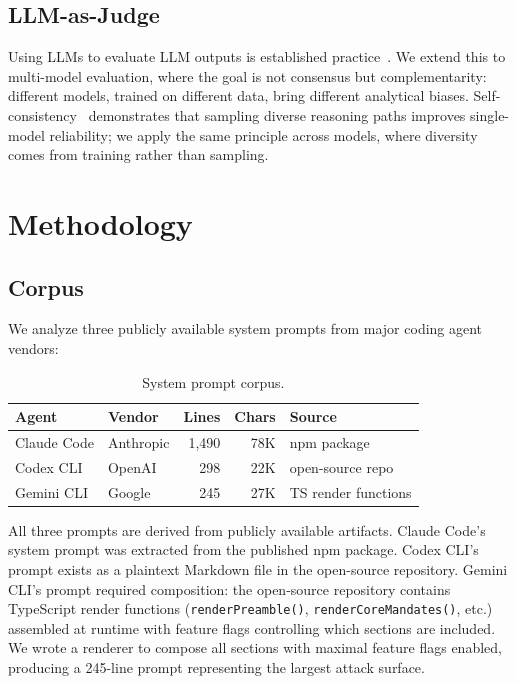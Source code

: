 \documentclass[11pt,a4paper]{article}
\begin{document}
\subsection{LLM-as-Judge}

Using LLMs to evaluate LLM outputs is established
practice~\citep{zheng2023judging}. We extend this to multi-model
evaluation, where the goal is not consensus but complementarity:
different models, trained on different data, bring different analytical
biases. Self-consistency~\citep{wang2022self} demonstrates that
sampling diverse reasoning paths improves single-model reliability; we
apply the same principle across models, where diversity comes from
training rather than sampling.


\section{Methodology}
\label{sec:methodology}

\subsection{Corpus}
\label{sec:corpus}

We analyze three publicly available system prompts from major coding
agent vendors:

\begin{table}[H]
\centering
\caption{System prompt corpus.}
\label{tab:corpus}
\begin{tabular}{@{}llrrl@{}}
\toprule
Agent & Vendor & Lines & Chars & Source \\
\midrule
Claude Code & Anthropic & 1{,}490 & 78K & npm package \\
Codex CLI & OpenAI & 298 & 22K & open-source repo \\
Gemini CLI & Google & 245 & 27K & TS render functions \\
\bottomrule
\end{tabular}
\end{table}

All three prompts are derived from publicly available artifacts. Claude
Code's system prompt was extracted from the published npm package.
Codex CLI's prompt exists as a plaintext Markdown file in the
open-source repository. Gemini CLI's prompt required composition: the
open-source repository contains TypeScript render functions
(\texttt{renderPreamble()}, \texttt{renderCoreMandates()}, etc.)
assembled at runtime with feature flags controlling which sections are
included. We wrote a renderer to compose all sections with maximal
feature flags enabled, producing a 245-line prompt representing the
largest attack surface.
\end{document}
